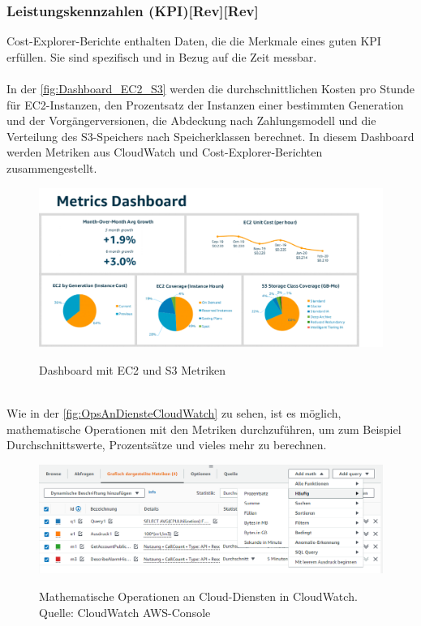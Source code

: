 \subsubsection*{Leistungskennzahlen (KPI)[Rev][Rev]}
Cost-Explorer-Berichte enthalten Daten, die die Merkmale eines guten KPI erfüllen. Sie sind spezifisch und in Bezug auf die Zeit messbar.
\\\\
In der \autoref{fig:Dashboard_EC2_S3} werden %
die durchschnittlichen Kosten pro Stunde für EC2-Instanzen, den Prozentsatz der Instanzen einer bestimmten Generation und der Vorgängerversionen, die Abdeckung nach Zahlungsmodell und die Verteilung des S3-Speichers nach Speicherklassen berechnet. In diesem Dashboard werden Metriken aus CloudWatch und  Cost-Explorer-Berichten zusammengestellt.
\begin{figure}[h!]
  \centering
  \includegraphics[scale=0.65]{sources/Dashboard_EC2_S3}
  \caption[Dashboard mit EC2 und S3 Metriken]{}
  \label{fig:Dashboard_EC2_S3} 
  Dashboard mit EC2 und S3 Metriken\cite{AMZ35}
\end{figure}\\
Wie in der \autoref{fig:OpsAnDiensteCloudWatch} zu sehen, ist es möglich, mathematische Operationen mit den Metriken durchzuführen, um zum Beispiel Durchschnittswerte, Prozentsätze und vieles mehr zu berechnen.
\begin{figure}[h!]
  \centering
  \includegraphics[scale=0.55]{sources/OpsAnDiensteCloudWatch}
  \caption[Operationen an Cloud-Diensten in CloudWatch]{}
  \label{fig:OpsAnDiensteCloudWatch} 
  Mathematische Operationen an Cloud-Diensten in CloudWatch.\\
  Quelle: CloudWatch AWS-Console
\end{figure}
